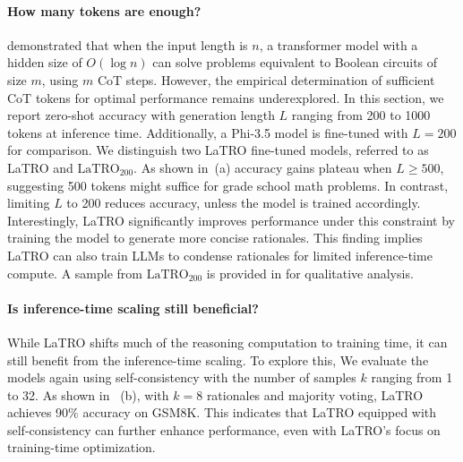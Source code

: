 \paragraph{How many tokens are enough?} \citet{DBLP:conf/iclr/0001LZ024} demonstrated that when the input length is $n$, a transformer model with a hidden size of $O(\log n)$ can solve problems equivalent to Boolean circuits of size $m$, using $m$ CoT steps. However, the empirical determination of sufficient CoT tokens for optimal performance remains underexplored. In this section, we report zero-shot accuracy with generation length $L$ ranging from 200 to 1000 tokens at inference time. Additionally, a Phi-3.5 model is fine-tuned with $L=200$ for comparison. We distinguish two LaTRO fine-tuned models, referred to as LaTRO and $\text{LaTRO}_{200}$. As shown in~(a) accuracy gains plateau when $L\geq 500$, suggesting 500 tokens might suffice for grade school math problems. In contrast, limiting $L$ to 200 reduces accuracy, unless the model is trained accordingly. Interestingly, LaTRO significantly improves performance under this constraint by training the model to generate more concise rationales. This finding implies LaTRO can also train LLMs to condense rationales for limited inference-time compute. A sample from $\text{LaTRO}_{200}$ is provided in  for qualitative analysis.



\paragraph{Is inference-time scaling still beneficial?} While LaTRO shifts much of the reasoning computation to training time, it can still benefit from the inference-time scaling. To explore this, We evaluate the models again using self-consistency with the number of samples $k$ ranging from 1 to 32. As shown in~ (b), with $k=8$ rationales and majority voting, LaTRO achieves 90\% accuracy on GSM8K. This indicates that LaTRO equipped with self-consistency can further enhance performance, even with LaTRO's focus on training-time optimization.


